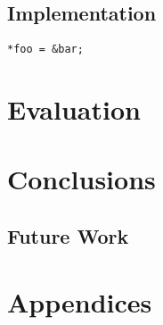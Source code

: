 \documentclass{UoYCSproject}
\begin{document}
\section{Implementation}

\begin{lstlisting}[label=c_1, caption=Placeholder C Code]
*foo = &bar;
\end{lstlisting}


\chapter{Evaluation}
\chapter{Conclusions}
\section{Future Work}



\chapter{Appendices}
\end{document}
